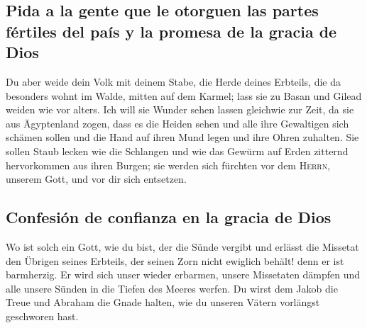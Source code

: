 \hypertarget{pida-a-la-gente-que-le-otorguen-las-partes-fuxe9rtiles-del-pauxeds-y-la-promesa-de-la-gracia-de-dios}{%
\subsection{Pida a la gente que le otorguen las partes fértiles del país
y la promesa de la gracia de
Dios}\label{pida-a-la-gente-que-le-otorguen-las-partes-fuxe9rtiles-del-pauxeds-y-la-promesa-de-la-gracia-de-dios}}

 Du aber weide dein Volk mit deinem Stabe, die Herde
deines Erbteils, die da besonders wohnt im Walde, mitten auf dem Karmel;
lass sie zu Basan und Gilead weiden wie vor alters.  Ich
will sie Wunder sehen lassen gleichwie zur Zeit, da sie aus Ägyptenland
zogen,  dass es die Heiden sehen und alle ihre Gewaltigen
sich schämen sollen und die Hand auf ihren Mund legen und ihre Ohren
zuhalten.  Sie sollen Staub lecken wie die Schlangen und
wie das Gewürm auf Erden zitternd hervorkommen aus ihren Burgen; sie
werden sich fürchten vor dem \textsc{Herrn}, unserem Gott, und vor dir
sich entsetzen.

\hypertarget{confesiuxf3n-de-confianza-en-la-gracia-de-dios}{%
\subsection{Confesión de confianza en la gracia de
Dios}\label{confesiuxf3n-de-confianza-en-la-gracia-de-dios}}

 Wo ist solch ein Gott, wie du bist, der die Sünde
vergibt und erlässt die Missetat den Übrigen seines Erbteils, der seinen
Zorn nicht ewiglich behält! denn er ist barmherzig.  Er
wird sich unser wieder erbarmen, unsere Missetaten dämpfen und alle
unsere Sünden in die Tiefen des Meeres werfen.  Du wirst
dem Jakob die Treue und Abraham die Gnade halten, wie du unseren Vätern
vorlängst geschworen hast.
